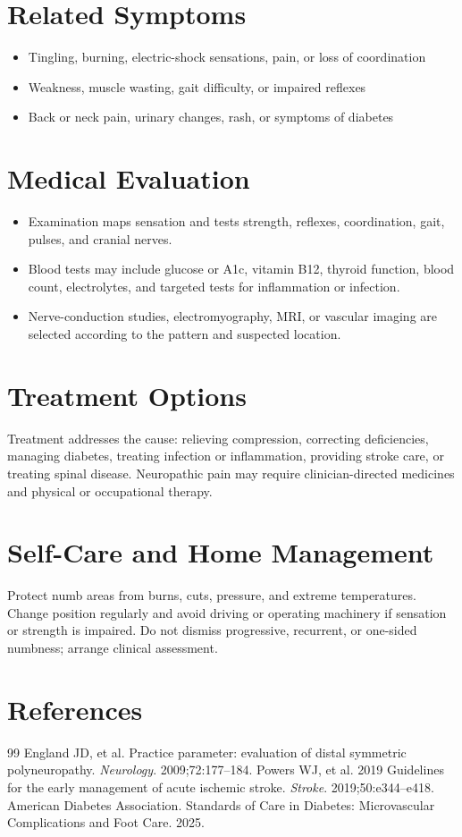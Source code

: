 \section*{Related Symptoms}
\begin{itemize}
  \item Tingling, burning, electric-shock sensations, pain, or loss of coordination
  \item Weakness, muscle wasting, gait difficulty, or impaired reflexes
  \item Back or neck pain, urinary changes, rash, or symptoms of diabetes
\end{itemize}

\section*{Medical Evaluation}
\begin{itemize}
  \item Examination maps sensation and tests strength, reflexes, coordination, gait, pulses, and cranial nerves.
  \item Blood tests may include glucose or A1c, vitamin B12, thyroid function, blood count, electrolytes, and targeted tests for inflammation or infection.
  \item Nerve-conduction studies, electromyography, MRI, or vascular imaging are selected according to the pattern and suspected location.
\end{itemize}

\section*{Treatment Options}
Treatment addresses the cause: relieving compression, correcting deficiencies, managing diabetes, treating infection or inflammation, providing stroke care, or treating spinal disease. Neuropathic pain may require clinician-directed medicines and physical or occupational therapy.

\section*{Self-Care and Home Management}
Protect numb areas from burns, cuts, pressure, and extreme temperatures. Change position regularly and avoid driving or operating machinery if sensation or strength is impaired. Do not dismiss progressive, recurrent, or one-sided numbness; arrange clinical assessment.

\section*{References}
\begin{thebibliography}{99}
 England JD, et al. Practice parameter: evaluation of distal symmetric polyneuropathy. \textit{Neurology}. 2009;72:177--184.
 Powers WJ, et al. 2019 Guidelines for the early management of acute ischemic stroke. \textit{Stroke}. 2019;50:e344--e418.
 American Diabetes Association. Standards of Care in Diabetes: Microvascular Complications and Foot Care. 2025.
\end{thebibliography}
